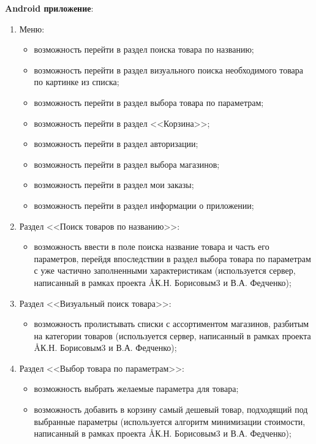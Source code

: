 \documentclass[a4paper,12pt,reqno]{article}
\begin{document}
  \noindent\textbf{Android приложение}:
  \begin{enumerate}
    \item Меню:
    \begin{itemize}
      \item возможность перейти в раздел поиска товара по названию;
      \item возможность перейти в раздел визуального поиска необходимого товара по картинке из списка;
      \item возможность перейти в раздел выбора товара по параметрам;
      \item возможность перейти в раздел <<Корзина>>;
      \item возможность перейти в раздел авторизации;
      \item возможность перейти в раздел выбора магазинов;
      \item возможность перейти в раздел мои заказы;
      \item возможность перейти в раздел информации о приложении;
    \end{itemize}
    \item Раздел <<Поиск товаров по названию>>:
    \begin{itemize}
      \item возможность ввести в поле поиска название товара и часть его параметров, перейдя впоследствии в раздел выбора товара по параметрам с уже частично заполненными характеристикам (используется сервер, написанный в рамках проекта \AA{К.Н. Борисовым}{3} и В.А. Федченко);
    \end{itemize}
    \item Раздел <<Визуальный поиск товара>>:
    \begin{itemize}
      \item возможность пролистывать списки с ассортиментом магазинов, разбитым на категории товаров (используется сервер, написанный в рамках проекта \AA{К.Н. Борисовым}{3} и В.А. Федченко);
    \end{itemize}
    \item Раздел <<Выбор товара по параметрам>>:
    \begin{itemize}
      \item возможность выбрать желаемые параметра для товара;
      \item возможность добавить в корзину самый дешевый товар, подходящий под выбранные параметры (используется алгоритм минимизации стоимости, написанный в рамках проекта \AA{К.Н. Борисовым}{3} и В.А. Федченко);
    \end{itemize}

\end{enumerate}
\end{document}
